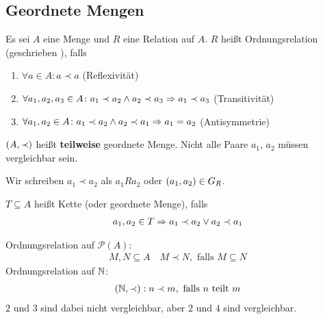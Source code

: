 \subsection{Geordnete Mengen}

\begin{definition}
    Es sei $A$ eine Menge und $R$ eine Relation auf $A$. $R$ heißt Ordnungsrelation (geschrieben \anf{$\prec$}), falls
    \begin{enumerate}[label=(\roman*)]
        \item $\forall a\in A\colon a \prec a$ (Reflexivität)
        \item $\forall a_1, a_2, a_3\in A\colon a_1\prec a_2 \land a_2 \prec a_3 \Rightarrow{} a_1 \prec a_3$ (Transitivität)
        \item $\forall a_1, a_2\in A\colon a_1\prec a_2 \land a_2 \prec a_1 \Rightarrow{} a_1 = a_2$ (Antisymmetrie)
    \end{enumerate}
    $\left(A, \prec\right)$ heißt \textbf{teilweise} geordnete Menge. Nicht alle Paare $a_1$, $a_2$ müssen vergleichbar sein.
\end{definition}

\begin{notation}
    Wir schreiben $a_1\prec a_2$ als $a_{1}Ra_{2}$ oder $\left(a_1, a_2\right)\in G_R$.
\end{notation}
\begin{definition}[Kette]
    $T\subseteq A$ heißt Kette (oder geordnete Menge), falls
    \begin{align*}
        a_1, a_2\in T \Rightarrow{} a_1\prec a_2 \lor a_2 \prec a_1
    \end{align*}
\end{definition}

\begin{beispiel}[Ordnungsrelation]
    Ordnungsrelation auf $\mathcal{P}(A)$:
    \begin{align*}
        M, N \subseteq A \quad M \prec N, \text{ falls } M\subseteq N
    \end{align*}
    \noindent Ordnungsrelation auf $\mathbb{N}$:
    \begin{align*}
    (\mathbb{N}, \prec)
        : n\prec m, \text{ falls $n$ teilt $m$}
    \end{align*}
    $2$ und $3$ sind dabei nicht vergleichbar, aber $2$ und $4$ sind vergleichbar.
\end{beispiel}

\newpage